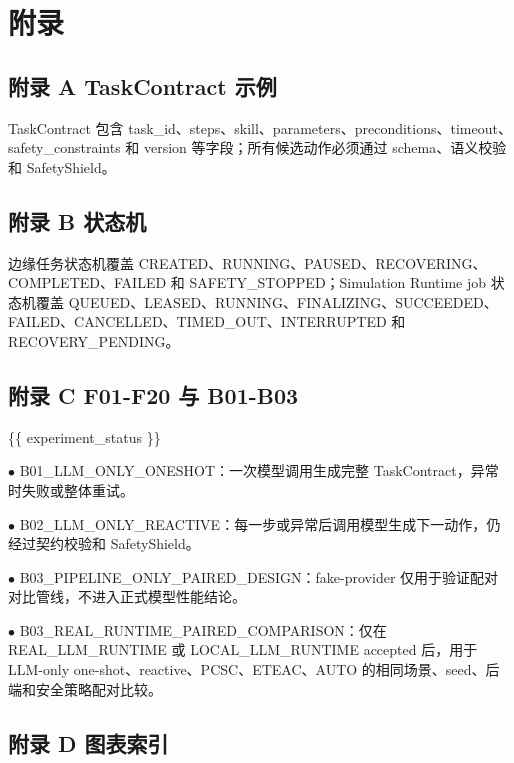 \appendix
\chapter{附录}

\section{附录 A TaskContract 示例}

TaskContract 包含 task\_id、steps、skill、parameters、preconditions、timeout、safety\_constraints 和 version 等字段；所有候选动作必须通过 schema、语义校验和 SafetyShield。\par

\section{附录 B 状态机}

边缘任务状态机覆盖 CREATED、RUNNING、PAUSED、RECOVERING、COMPLETED、FAILED 和 SAFETY\_STOPPED；Simulation Runtime job 状态机覆盖 QUEUED、LEASED、RUNNING、FINALIZING、SUCCEEDED、FAILED、CANCELLED、TIMED\_OUT、INTERRUPTED 和 RECOVERY\_PENDING。\par

\section{附录 C F01-F20 与 B01-B03}

\{\{ experiment\_status \}\}\par

\noindent $\bullet$ B01\_LLM\_ONLY\_ONESHOT：一次模型调用生成完整 TaskContract，异常时失败或整体重试。\par
\noindent $\bullet$ B02\_LLM\_ONLY\_REACTIVE：每一步或异常后调用模型生成下一动作，仍经过契约校验和 SafetyShield。\par
\noindent $\bullet$ B03\_PIPELINE\_ONLY\_PAIRED\_DESIGN：fake-provider 仅用于验证配对对比管线，不进入正式模型性能结论。\par
\noindent $\bullet$ B03\_REAL\_RUNTIME\_PAIRED\_COMPARISON：仅在 REAL\_LLM\_RUNTIME 或 LOCAL\_LLM\_RUNTIME accepted 后，用于 LLM-only one-shot、reactive、PCSC、ETEAC、AUTO 的相同场景、seed、后端和安全策略配对比较。\par

\section{附录 D 图表索引}

